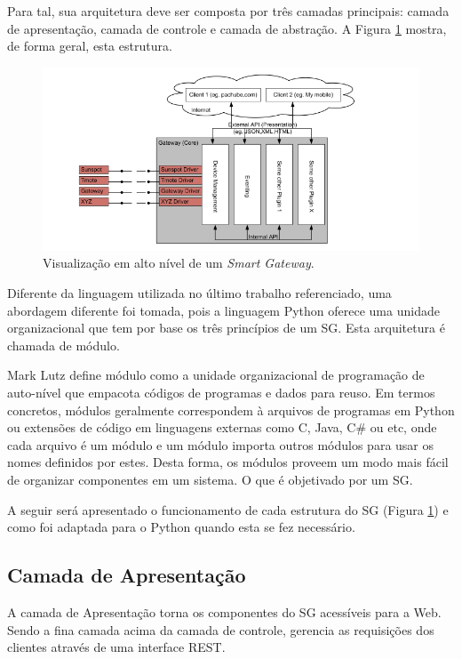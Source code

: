 \documentclass[12pt,a4paper,oneside]{report}
\begin{document}
Para tal, sua arquitetura deve ser composta por três camadas principais: camada de apresentação, camada de controle e camada de abstração. A Figura \ref{fig:estrutura-sg} mostra, de forma geral, esta estrutura.

\begin{figure}[htbp]
   \centering
    \includegraphics[width=1\textwidth]{figuras/figura_2_8}
    \caption{Visualização em alto nível de um \emph{Smart Gateway}.}
    \label{fig:estrutura-sg}
\end{figure}

Diferente da linguagem utilizada no último trabalho referenciado, uma abordagem diferente foi tomada, pois a linguagem Python oferece uma unidade organizacional que tem por base os três princípios de um SG. Esta arquitetura é chamada de módulo.

Mark Lutz \cite{python} define módulo como a unidade organizacional de programação de auto-nível que empacota códigos de programas e dados para reuso. Em termos concretos, módulos geralmente correspondem à arquivos de programas em Python ou extensões de código em linguagens externas como C, Java, C\# ou etc, onde cada arquivo é um módulo e um módulo importa outros módulos para usar os nomes definidos por estes. Desta forma, os módulos proveem um modo mais fácil de organizar componentes em um sistema. O que é objetivado por um SG.

A seguir será apresentado o funcionamento de cada estrutura do SG (Figura \ref{fig:estrutura-sg}) e como foi adaptada para o Python quando esta se fez necessário.

\subsection{Camada de Apresentação}

A camada de Apresentação torna os componentes do SG acessíveis para a Web. Sendo a fina camada acima da camada de controle, gerencia as requisições dos clientes através de uma interface REST.
\end{document}
